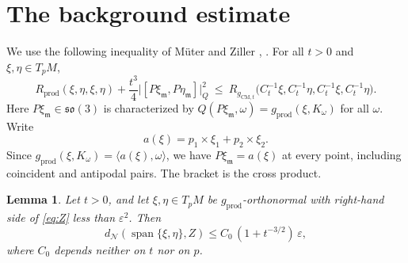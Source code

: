 \documentclass[11pt]{amsart}
\newtheorem{lemma}[theorem]{Lemma}
\theoremstyle{definition}
\theoremstyle{remark}
\newcommand{\gprod}{g_{\mathrm{prod}}}
\newcommand{\gCM}{g_{\mathrm{CM},t}}
\newcommand{\Gr}{\mathcal{N}}
\newcommand{\Span}{\operatorname{span}}
\begin{document}
\section{The background estimate}\label{sec:growth}

We use the following inequality of Müter and Ziller \cite[Proposition~1.3]{Z}, \cite{Mu}. For all $t>0$ and $\xi,\eta\in T_pM$,
\begin{equation}\label{eq:Z}
R_{\mathrm{prod}}(\xi,\eta,\xi,\eta)+\frac{t^3}{4}\big|[P\xi_{\mathfrak m},P\eta_{\mathfrak m}]\big|_Q^2\ \le\ R_{\gCM}\big(C_t^{-1}\xi,C_t^{-1}\eta,C_t^{-1}\xi,C_t^{-1}\eta\big).
\end{equation}
Here $P\xi_{\mathfrak m}\in\mathfrak{so}(3)$ is characterized by $Q(P\xi_{\mathfrak m},\omega)=\gprod(\xi,K_\omega)$ for all $\omega$. Write
\[ a(\xi)=p_1\times\xi_1+p_2\times\xi_2 . \]
Since $\gprod(\xi,K_\omega)=\langle a(\xi),\omega\rangle$, we have $P\xi_{\mathfrak m}=a(\xi)$ at every point, including coincident and antipodal pairs. The bracket is the cross product.

\begin{lemma}\label{lem:B1}
Let $t>0$, and let $\xi,\eta\in T_pM$ be $\gprod$-orthonormal with right-hand side of \eqref{eq:Z} less than $\varepsilon^2$. Then
\[ d_\Gr(\Span\{\xi,\eta\},Z)\le C_0\,(1+t^{-3/2})\,\varepsilon , \]
where $C_0$ depends neither on $t$ nor on $p$.
\end{lemma}
\end{document}
